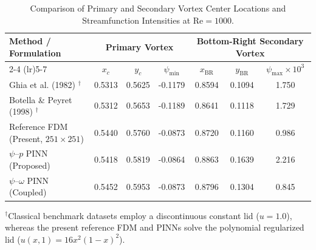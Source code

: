 \begin{table}[htbp]
\centering
\caption{Comparison of Primary and Secondary Vortex Center Locations and Streamfunction Intensities at $\mathrm{Re} = 1000$.}
\label{tab:vortex_centers}
\small
\setlength{\tabcolsep}{3.8pt}
\begin{tabular}{lcccccc}
\toprule
\textbf{Method / Formulation} & \multicolumn{3}{c}{\textbf{Primary Vortex}} & \multicolumn{3}{c}{\textbf{Bottom-Right Secondary Vortex}} \\
\cmidrule(lr){2-4} \cmidrule(lr){5-7}
& $x_c$ & $y_c$ & $\psi_{\min}$ & $x_{\mathrm{BR}}$ & $y_{\mathrm{BR}}$ & $\psi_{\max} \times 10^3$ \\
\midrule
Ghia et al. (1982) \cite{ghia1982high}$^\dagger$ & 0.5313 & 0.5625 & -0.1179 & 0.8594 & 0.1094 & 1.750 \\
Botella \& Peyret (1998) \cite{botella1998benchmark}$^\dagger$ & 0.5312 & 0.5653 & -0.1189 & 0.8641 & 0.1118 & 1.729 \\
Reference FDM (Present, $251\times 251$) & 0.5440 & 0.5760 & -0.0873 & 0.8720 & 0.1160 & 0.986 \\
$\psi\text{--}p$ PINN (Proposed) & 0.5418 & 0.5819 & -0.0864 & 0.8863 & 0.1639 & 2.216 \\
$\psi\text{--}\omega$ PINN (Coupled) & 0.5452 & 0.5953 & -0.0873 & 0.8796 & 0.1304 & 0.845 \\
\bottomrule
\end{tabular}
\vspace{0.2em}
\parbox{\textwidth}{\footnotesize $^\dagger$Classical benchmark datasets employ a discontinuous constant lid ($u=1.0$), whereas the present reference FDM and PINNs solve the polynomial regularized lid ($u(x,1)=16x^2(1-x)^2$).}
\end{table}
